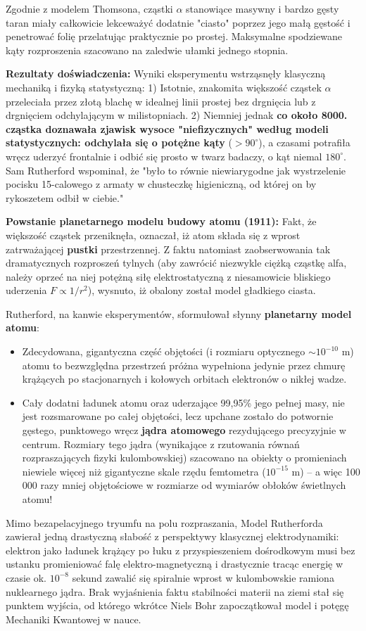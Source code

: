 \documentclass[11pt, a4paper]{article}
\begin{document}
Zgodnie z modelem Thomsona, cząstki $\alpha$ stanowiące masywny i bardzo gęsty taran miały całkowicie lekceważyć dodatnie "ciasto" poprzez jego małą gęstość i penetrować folię przelatując praktycznie po prostej. Maksymalne spodziewane kąty rozproszenia szacowano na zaledwie ułamki jednego stopnia.

\textbf{Rezultaty doświadczenia:}
Wyniki eksperymentu wstrząsnęły klasyczną mechaniką i fizyką statystyczną:
1) Istotnie, znakomita większość cząstek $\alpha$ przeleciała przez złotą blachę w idealnej linii prostej bez drgnięcia lub z drgnięciem odchylającym w milistopniach.
2) Niemniej jednak \textbf{co około 8000. cząstka doznawała zjawisk wysoce "niefizycznych" według modeli statystycznych: odchylała się o potężne kąty} ($> 90^\circ$), a czasami potrafiła wręcz uderzyć frontalnie i odbić się prosto w twarz badaczy, o kąt niemal $180^\circ$.
Sam Rutherford wspominał, że "było to równie niewiarygodne jak wystrzelenie pocisku 15-calowego z armaty w chusteczkę higieniczną, od której on by rykoszetem odbił w ciebie."

\textbf{Powstanie planetarnego modelu budowy atomu (1911):}
Fakt, że większość cząstek przeniknęła, oznaczał, iż atom składa się z wprost zatrważającej \textbf{pustki} przestrzennej.
Z faktu natomiast zaobserwowania tak dramatycznych rozproszeń tylnych (aby zawrócić niezwykle ciężką cząstkę alfa, należy oprzeć na niej potężną siłę elektrostatyczną z niesamowicie bliskiego uderzenia $F \propto 1/r^2$), wysnuto, iż obalony został model gładkiego ciasta. 

Rutherford, na kanwie eksperymentów, sformułował słynny \textbf{planetarny model atomu}:
\begin{itemize}
    \item Zdecydowana, gigantyczna część objętości (i rozmiaru optycznego $\sim 10^{-10}$ m) atomu to bezwzględna przestrzeń próżna wypełniona jedynie przez chmurę krążących po stacjonarnych i kołowych orbitach elektronów o nikłej wadze.
    \item Cały dodatni ładunek atomu oraz uderzające 99,95\% jego pełnej masy, nie jest rozsmarowane po całej objętości, lecz upchane zostało do potwornie gęstego, punktowego wręcz \textbf{jądra atomowego} rezydującego precyzyjnie w centrum. Rozmiary tego jądra (wynikające z rzutowania równań rozpraszających fizyki kulombowskiej) szacowano na obiekty o promieniach niewiele więcej niż gigantyczne skale rzędu femtometra ($10^{-15}$ m) – a więc 100 000 razy mniej objętościowe w rozmiarze od wymiarów obłoków świetlnych atomu!
\end{itemize}
Mimo bezapelacyjnego tryumfu na polu rozpraszania, Model Rutherforda zawierał jedną drastyczną słabość z perspektywy klasycznej elektrodynamiki: elektron jako ładunek krążący po łuku z przyspieszeniem dośrodkowym musi bez ustanku promieniować falę elektro-magnetyczną i drastycznie tracąc energię w czasie ok. $10^{-8}$ sekund zawalić się spiralnie wprost w kulombowskie ramiona nuklearnego jądra. Brak wyjaśnienia faktu stabilności materii na ziemi stał się punktem wyjścia, od którego wkrótce Niels Bohr zapoczątkował model i potęgę Mechaniki Kwantowej w nauce.
\end{document}
